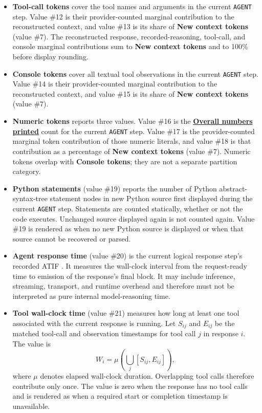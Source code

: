\documentclass[11pt]{article}
\begin{document}
\begin{itemize}
  \item \textbf{Tool-call tokens} cover the tool names and arguments in the current \texttt{AGENT} step.
  Value \#12 is their provider-counted marginal contribution to the reconstructed context, and value \#13 is its share of \textbf{New context tokens} (value \#7).
  The reconstructed response, recorded-reasoning, tool-call, and console marginal contributions sum to \textbf{New context tokens} and to 100\% before display rounding.

  \item \textbf{Console tokens} cover all textual tool observations in the current \texttt{AGENT} step.
  Value \#14 is their provider-counted marginal contribution to the reconstructed context, and value \#15 is its share of \textbf{New context tokens} (value \#7).

  \item \textbf{Numeric tokens} reports three values.
  Value \#16 is the \hyperref[metric:overall-numbers-printed]{\textbf{Overall numbers printed}} count for the current \texttt{AGENT} step.
  Value \#17 is the provider-counted marginal token contribution of those numeric literals, and value \#18 is that contribution as a percentage of \textbf{New context tokens} (value \#7).
  Numeric tokens overlap with \textbf{Console tokens}; they are not a separate partition category.

  \item \textbf{Python statements} (value \#19) reports the number of Python abstract-syntax-tree statement nodes in new Python source first displayed during the current \texttt{AGENT} step.
  Statements are counted statically, whether or not the code executes.
  Unchanged source displayed again is not counted again.
  Value \#19 is rendered as \code{-} when no new Python source is displayed or when that source cannot be recovered or parsed.

  \item \textbf{Agent response time} (value \#20) is the current logical response step's recorded ATIF .
  It measures the wall-clock interval from the request-ready time to emission of the response's final block.
  It may include inference, streaming, transport, and runtime overhead and therefore must not be interpreted as pure internal model-reasoning time.

  \item \textbf{Tool wall-clock time} (value \#21) measures how long at least one tool associated with the current response is running.
  Let \(S_{ij}\) and \(E_{ij}\) be the matched tool-call and observation timestamps for tool call \(j\) in response \(i\).
  The value is
  \[
    W_i =
    \mu\!\left(\bigcup_j [S_{ij}, E_{ij}]\right),
  \]
  where \(\mu\) denotes elapsed wall-clock duration.
  Overlapping tool calls therefore contribute only once.
  The value is zero when the response has no tool calls and is rendered as \code{-} when a required start or completion timestamp is unavailable.


\end{itemize}
\end{document}
